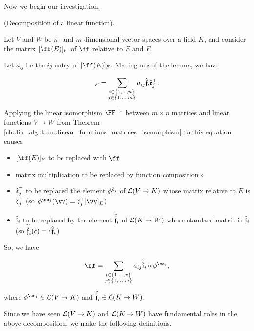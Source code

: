 Now we begin our investigation.

\begin{deriv}
\label{ch::motivated_intro::deriv::decomposition_of_a_linear_function}
    (Decomposition of a linear function).

    Let $V$ and $W$ be $n$- and $m$-dimensional vector spaces over a field $K$, and consider the matrix $[\ff(E)]_F$ of $\ff$ relative to $E$ and $F$.
    
    Let $a_{ij}$ be the $ij$ entry of $[\ff(E)]_F$. Making use of the lemma, we have

    \begin{align*}
        [\ff(E)]_F = \sum_{\substack{i \in \{1, ..., n\} \\ j \in \{1, ..., m\}}} a_{ij} \sff_i \see_j^\top.
    \end{align*}

    Applying the linear isomorphism $\FF^{-1}$ between $m \times n$ matrices and linear functions $V \rightarrow W$ from Theorem \ref{ch::lin_alg::thm::linear_functions_matrices_isomorphism} to this equation causes  \begin{itemize}
        \item $[\ff(E)]_F$ to be replaced with $\ff$
        \item matrix multiplication to be replaced by function composition $\circ$
        \item $\hat{\mathfrak{e}}_j^\top$ to be replaced the element $\phi^{\hat{\mathfrak{e}}_j}$ of $\mathcal{L}(V \rightarrow K)$ whose matrix relative to $E$ is $\hat{\mathfrak{e}}_j^\top$ (so $\phi^{\ee_j}(\vv) = \see_j^\top [\vv]_E$)
        \item $\hat{\mathfrak{f}}_i$ to be replaced by the element $\widetilde{\hat{\mathfrak{f}}}_i$ of $\mathcal{L}(K \rightarrow W)$ whose standard matrix is $\hat{\mathfrak{f}}_i$ (so $\widetilde{\hat{\mathfrak{f}}}_i(c) = c\hat{\mathfrak{f}}_i$)
    \end{itemize}

    So, we have

    \begin{align*}
        \ff = \sum_{\substack{i \in \{1, ..., n\} \\ j \in \{1, ..., m\}}} a_{ij} \tsff_i \circ \phi^{\ee_i},
    \end{align*}

    where $\phi^{\ee_i} \in \LLLL(V \rightarrow K)$ and $\widetilde{\hat{\mathfrak{f}}}_i \in \mathcal{L}(K \rightarrow W)$.
\end{deriv}

\newpage

Since we have seen $\mathcal{L}(V \rightarrow K)$ and $\mathcal{L}(K \rightarrow W)$ have fundamental roles in the above decomposition, we make the following definitions.

